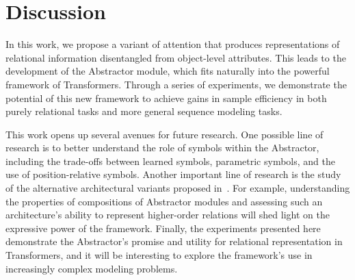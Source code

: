 \section{Discussion}\label{sec:discuss}


In this work, we propose a variant of attention that produces representations of relational information disentangled from object-level attributes. This leads to the development of the Abstractor module, which fits naturally into the powerful framework of Transformers. Through a series of experiments, we demonstrate the potential of this new framework to achieve gains in sample efficiency in both purely relational tasks and more general sequence modeling tasks.

This work opens up several avenues for future research. One possible line of research is to better understand the role of symbols within the Abstractor, including the trade-offs between learned symbols, parametric symbols, and the use of position-relative symbols. Another important line of research is the study of the alternative architectural variants proposed in~. For example, understanding the properties of compositions of Abstractor modules and assessing such an architecture's ability to represent higher-order relations will shed light on the expressive power of the framework. Finally, the experiments presented here demonstrate the Abstractor's promise and utility for relational representation in Transformers, and it will be interesting to explore the framework's use in increasingly complex modeling problems.
